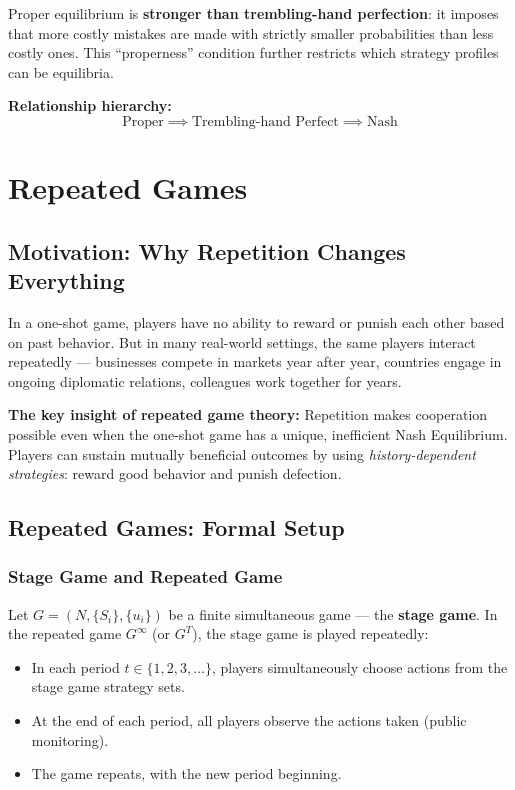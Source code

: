 \documentclass[hidelinks]{article}
\begin{document}
Proper equilibrium is \textbf{stronger than trembling-hand perfection}: it imposes that more costly mistakes are made with strictly smaller probabilities than less costly ones. This ``properness'' condition further restricts which strategy profiles can be equilibria.

\textbf{Relationship hierarchy:}
\[
\text{Proper} \implies \text{Trembling-hand Perfect} \implies \text{Nash}
\]

\newpage
\section{Repeated Games}

\subsection{Motivation: Why Repetition Changes Everything}

In a one-shot game, players have no ability to reward or punish each other based on past behavior. But in many real-world settings, the same players interact repeatedly — businesses compete in markets year after year, countries engage in ongoing diplomatic relations, colleagues work together for years.

\textbf{The key insight of repeated game theory:} Repetition makes cooperation possible even when the one-shot game has a unique, inefficient Nash Equilibrium. Players can sustain mutually beneficial outcomes by using \textit{history-dependent strategies}: reward good behavior and punish defection.

\subsection{Repeated Games: Formal Setup}

\subsubsection{Stage Game and Repeated Game}

Let $G = (N, \{S_i\}, \{u_i\})$ be a finite simultaneous game — the \textbf{stage game}. In the repeated game $G^\infty$ (or $G^T$), the stage game is played repeatedly:

\begin{itemize}
    \item In each period $t \in \{1, 2, 3, \ldots\}$, players simultaneously choose actions from the stage game strategy sets.
    \item At the end of each period, all players observe the actions taken (public monitoring).
    \item The game repeats, with the new period beginning.
\end{itemize}
\end{document}
